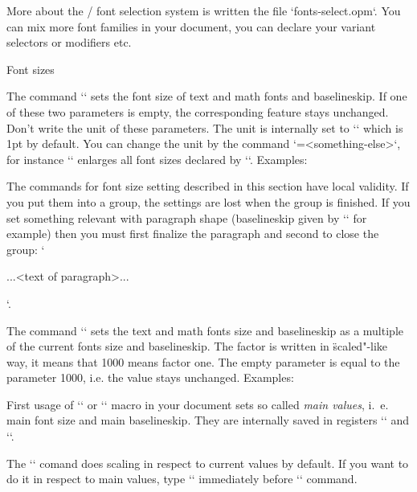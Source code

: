 \new
More about the \OpTeX/ font selection system is written the file
`fonts-select.opm`. You can mix more font families in your document, you can
declare your variant selectors or modifiers etc.


\sec Font sizes

The command `` sets the font size of text and
math fonts and baselineskip. If one of these two parameters is empty, the
corresponding feature stays unchanged. Don't write the unit of these
parameters. The unit is internally set to `\ptunit` which is 1pt by default.
You can change the unit by the command `\ptunit=<something-else>`, 
for instance `\ptunit=1mm` enlarges all font sizes declared by `\typosize`.
Examples:

\begtt
\typosize[10/12]   %
\typosize[11/12.5] %
\typosize[8/]      %
\endtt

The commands for font size setting described in this section
have local validity. If you put them into a group, 
the settings are lost when the group is finished. If you set 
something relevant with paragraph shape (baselineskip given by 
`\typosize` for example) then you must first finalize the 
paragraph and second to close the group: 
`{\typosize[12/14] ...<text of paragraph>... \par}`. 

The command
``
sets the text and math fonts
size and baselineskip as a multiple of the current fonts size and
baselineskip. The factor is written in \"scaled"-like way, it means that 1000
means factor one. The empty parameter is equal to the parameter 1000,
i.e. the value stays unchanged. Examples:

\begtt
\typoscale[800/800]    %
\typoscale[\magstep2/] %
\endtt

First usage of `\typosize` or `\typoscale` macro in your document sets so
called {\em main values}, i.~e. main font size and main baselineskip. They are internally 
saved in registers `\mainfosize` and `\mainbaselineskip`. 

\new
The `\typoscale` comand does scaling in respect to current values by default. 
If you want to do it in respect to main values, type `\scalemain` immediately
before `\typoscale` command.

\begtt
\typosize[12/14.4] %
\typosize[15/18]   %
\scalemain \typoscale[800/800] %
\endtt

